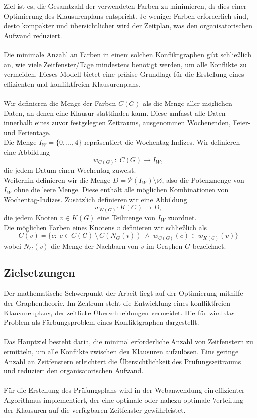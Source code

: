 Ziel ist es, die Gesamtzahl der verwendeten Farben zu minimieren, da dies einer Optimierung des Klausurenplans entspricht. Je weniger Farben erforderlich sind, desto kompakter und übersichtlicher wird der Zeitplan, was den organisatorischen Aufwand reduziert.\\\\
Die minimale Anzahl an Farben in einem solchen Konfliktgraphen gibt schließlich an, wie viele Zeitfenster/Tage mindestens benötigt werden, um alle Konflikte zu vermeiden. Dieses Modell bietet eine präzise Grundlage für die Erstellung eines effizienten und konfliktfreien Klausurenplans.\\\\
Wir definieren die Menge der Farben $C(G)$ als die Menge aller möglichen Daten, an denen eine Klausur stattfinden kann. Diese umfasst alle Daten innerhalb eines zuvor festgelegten Zeitraums, ausgenommen Wochenenden, Feier- und Ferientage.\\
Die Menge $I_W = \{0, \dots, 4\}$ repräsentiert die Wochentag-Indizes. Wir definieren eine Abbildung 
$$ w_{C(G)} \colon \; C(G) \rightarrow I_W, $$
die jedem Datum einen Wochentag zuweist.\\
Weiterhin definieren wir die Menge $ D = \mathcal{P}(I_W) \setminus \varnothing$, also die Potenzmenge von $I_W$ ohne die leere Menge. Diese enthält alle möglichen Kombinationen von Wochentag-Indizes. Zusätzlich definieren wir eine Abbildung 
$$ w_{K(G)} \colon K(G) \rightarrow D, $$
die jedem Knoten $v \in K(G)$ eine Teilmenge von $I_W$ zuordnet.\\
Die möglichen Farben eines Knotens $v$ definieren wir schließlich als
$$
C(v)= \{ c \colon \; c \in C(G) \, \setminus \, C(N_G(v)) \; \wedge \; w_{C(G)}(c) \in w_{K(G)}(v)\}
$$
wobei $N_G(v)$ die Menge der Nachbarn von $v$ im Graphen $G$ bezeichnet. 

\subsection{Zielsetzungen}
Der mathematische Schwerpunkt der Arbeit liegt auf der Optimierung mithilfe der Graphentheorie. Im Zentrum steht die Entwicklung eines konfliktfreien Klausurenplans, der zeitliche Überschneidungen vermeidet. Hierfür wird das Problem als Färbungsproblem eines Konfliktgraphen dargestellt.\\\\
Das Hauptziel besteht darin, die minimal erforderliche Anzahl von Zeitfenstern zu ermitteln, um alle Konflikte zwischen den Klausuren aufzulösen. Eine geringe Anzahl an Zeitfenstern erleichtert die Übersichtlichkeit des Prüfungszeitraums und reduziert den organisatorischen Aufwand.\\\\
Für die Erstellung des Prüfungsplans wird in der Webanwendung ein effizienter Algorithmus implementiert, der eine optimale oder nahezu optimale Verteilung der Klausuren auf die verfügbaren Zeitfenster gewährleistet.